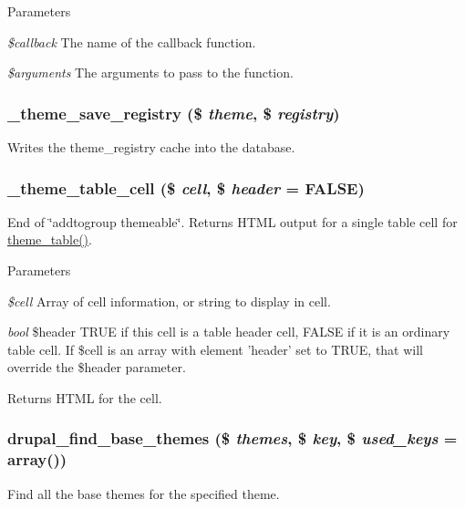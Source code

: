 \begin{DoxyParams}{Parameters}
\item[{\em \$callback}]The name of the callback function. \item[{\em \$arguments}]The arguments to pass to the function. \end{DoxyParams}
\hypertarget{includes_2theme_8inc_aa74b1ecea2de39ca0413a1a661167d39}{
\subsubsection[{\_\-theme\_\-save\_\-registry}]{\setlength{\rightskip}{0pt plus 5cm}\_\-theme\_\-save\_\-registry (\$ {\em theme}, \/  \$ {\em registry})}}
\label{includes_2theme_8inc_aa74b1ecea2de39ca0413a1a661167d39}
Writes the theme\_\-registry cache into the database. \hypertarget{includes_2theme_8inc_adf2a29e2c6631b7c0ecd833cafda9b40}{
\subsubsection[{\_\-theme\_\-table\_\-cell}]{\setlength{\rightskip}{0pt plus 5cm}\_\-theme\_\-table\_\-cell (\$ {\em cell}, \/  \$ {\em header} = {\ttfamily FALSE})}}
\label{includes_2theme_8inc_adf2a29e2c6631b7c0ecd833cafda9b40}
End of \char`\"{}addtogroup themeable\char`\"{}. Returns HTML output for a single table cell for \hyperlink{group__themeable_ga9e35aa108c35f87b588197138a51823d}{theme\_\-table()}.


\begin{DoxyParams}{Parameters}
\item[{\em \$cell}]Array of cell information, or string to display in cell. \item[{\em bool}]\$header TRUE if this cell is a table header cell, FALSE if it is an ordinary table cell. If \$cell is an array with element 'header' set to TRUE, that will override the \$header parameter.\end{DoxyParams}
\begin{DoxyReturn}{Returns}
HTML for the cell. 
\end{DoxyReturn}
\hypertarget{includes_2theme_8inc_ab9b1b3016f42a43d21096d650ffe7ec1}{
\subsubsection[{drupal\_\-find\_\-base\_\-themes}]{\setlength{\rightskip}{0pt plus 5cm}drupal\_\-find\_\-base\_\-themes (\$ {\em themes}, \/  \$ {\em key}, \/  \$ {\em used\_\-keys} = {\ttfamily array()})}}
\label{includes_2theme_8inc_ab9b1b3016f42a43d21096d650ffe7ec1}
Find all the base themes for the specified theme.

